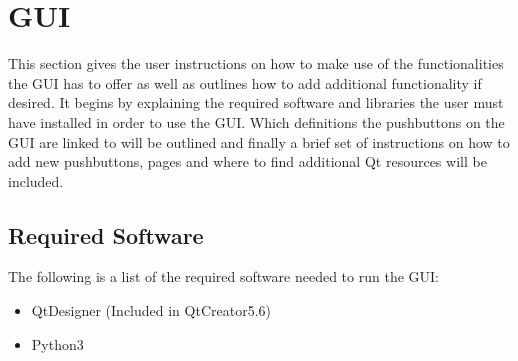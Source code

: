 \section{GUI}
This section gives the user instructions on how to make use of the functionalities the GUI has to offer as well as outlines how to add additional functionality if desired. It begins by explaining the required software and libraries the user must have installed in order to use the GUI. Which definitions the pushbuttons on the GUI are linked to will be outlined and finally a brief set of instructions on how to add new pushbuttons, pages and where to find additional Qt resources will be included. 

\subsection{Required Software}
The following is a list of the required software needed to run the GUI:

\begin{itemize}
	\item QtDesigner (Included in QtCreator5.6)
	\item Python3
\end{itemize}

